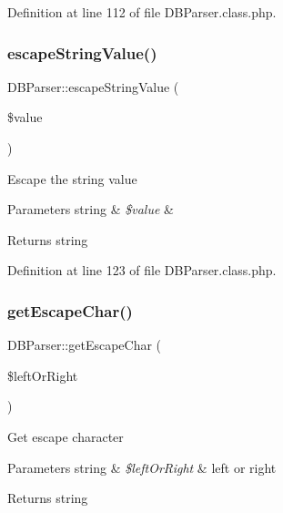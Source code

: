 Definition at line 112 of file D\+B\+Parser.\+class.\+php.

\hypertarget{classDBParser_ac4a2f15f2cc6c4f0edf848cfc0005259}{}\label{classDBParser_ac4a2f15f2cc6c4f0edf848cfc0005259} 
\subsubsection{\texorpdfstring{escape\+String\+Value()}{escapeStringValue()}}
{\footnotesize\ttfamily D\+B\+Parser\+::escape\+String\+Value (\begin{DoxyParamCaption}\item[{}]{\$value }\end{DoxyParamCaption})}

Escape the string value


\begin{DoxyParams}[1]{Parameters}
string & {\em \$value} & \\
\hline
\end{DoxyParams}
\begin{DoxyReturn}{Returns}
string 
\end{DoxyReturn}


Definition at line 123 of file D\+B\+Parser.\+class.\+php.

\hypertarget{classDBParser_aed9e06c08955d267a0576b178f37d6ee}{}\label{classDBParser_aed9e06c08955d267a0576b178f37d6ee} 
\subsubsection{\texorpdfstring{get\+Escape\+Char()}{getEscapeChar()}}
{\footnotesize\ttfamily D\+B\+Parser\+::get\+Escape\+Char (\begin{DoxyParamCaption}\item[{}]{\$left\+Or\+Right }\end{DoxyParamCaption})}

Get escape character


\begin{DoxyParams}[1]{Parameters}
string & {\em \$left\+Or\+Right} & left or right \\
\hline
\end{DoxyParams}
\begin{DoxyReturn}{Returns}
string 
\end{DoxyReturn}



